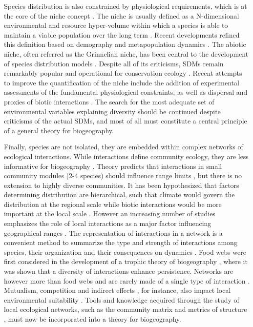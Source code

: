 Species distribution is also constrained by physiological requirements, which is at the core of the niche concept \citep{Peterson2011}. The niche is usually defined as a N-dimensional environmental and resource hyper-volume within which a species is able to maintain a viable population over the long term \citep{Chase2003}. Recent developments refined this definition based on demography and metapopulation dynamics \citep{Holt2009}. The abiotic niche, often referred as the Grinnelian niche, has been central to the development of species distribution models \citep[SDMs,][]{Jeschke2008}. Despite all of its criticisms, SDMs remain remarkably popular and operational for conservation ecology \citep{Guisan2013}. Recent attempts to improve the quantification of the niche include the addition of experimental assessments of the fundamental physiological constraints, as well as dispersal and proxies of biotic interactions \citep{Boulangeat2012}. The search for the most adequate set of environmental variables explaining diversity should be continued despite criticisms of the actual SDMs, and most of all must constitute a central principle of a general theory for biogeography.

Finally, species are not isolated, they are embedded within complex networks of ecological interactions. While interactions define community ecology, they are less informative for biogeography \citep{Peterson2003}. Theory predicts that interactions in small community modules (2-4 species) should influence range limits \citep{Gilman2010}, but there is no extension to highly diverse communities. It has been hypothesized that factors determining distribution are hierarchical, such that climate would govern the distribution at the regional scale while biotic interactions would be more important at the local scale \citep{Araujo2014}. However an increasing number of studies emphasizes the role of local interactions as a major factor influencing geographical ranges \citep{Jabot2012, Gotelli2010}. The representation of interactions in a network is a convenient method to summarize the type and strength of interactions among species, their organization \citep{Proulx2005} and their consequences on dynamics \citep{Allesina2012a}. Food webs were first considered in the development of a trophic theory of biogeography \citep{Gravel2011}, where it was shown that a diversity of interactions enhance persistence. Networks are however more than food webs and are rarely made of a single type of interaction \citep{Kefi2012}. Mutualism, competition and indirect effects \citep{Wootton1994}, for instance, also impact local environmental suitability \citep{Godsoe2012}. Tools and knowledge acquired through the study of local ecological networks, such as the community matrix and metrics of structure \citep{Allesina2012a}, must now be incorporated into a theory for biogeography.

